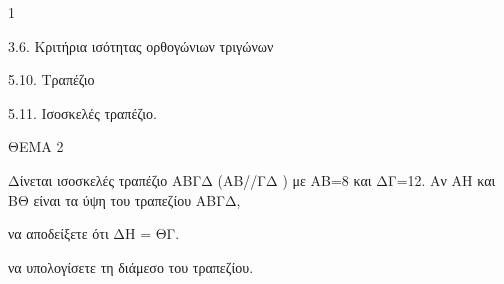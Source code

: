 \begin{ylh}{1}
    \item 3.6. Κριτήρια ισότητας ορθογώνιων τριγώνων
    \item 5.10. Τραπέζιο
    \item 5.11. Ισοσκελές τραπέζιο.
\end{ylh}

ΘΕΜΑ 2

Δίνεται ισοσκελές τραπέζιο ΑΒΓΔ (ΑΒ//ΓΔ ) με ΑΒ=8 και ΔΓ=12. Αν ΑΗ και ΒΘ είναι τα ύψη του τραπεζίου ΑΒΓΔ,

\begin{alist}
\item να αποδείξετε ότι ΔΗ = ΘΓ. 

\item να υπολογίσετε τη διάμεσο του τραπεζίου. 
\end{alist}
